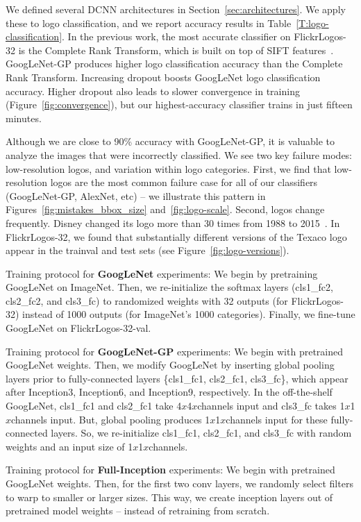 \documentclass{bmvc2k}
\begin{document}
We defined several DCNN architectures in Section~\ref{sec:architectures}.
We apply these to logo classification, and we report accuracy results in Table~\ref{T:logo-classification}.
In the previous work, the most accurate classifier on FlickrLogos-32 is the Complete Rank Transform, which is built on top of SIFT features~\cite{Boia2014}.
GoogLeNet-GP produces higher logo classification accuracy than the Complete Rank Transform.
Increasing dropout boosts GoogLeNet logo classification accuracy.
Higher dropout also leads to slower convergence in training (Figure~\ref{fig:convergence}), but our highest-accuracy classifier trains in just fifteen minutes.

Although we are close to 90\% accuracy with GoogLeNet-GP, it is valuable to analyze the images that were incorrectly classified.
We see two key failure modes: low-resolution logos, and variation within logo categories.
First, we find that low-resolution logos are the most common failure case for all of our classifiers (GoogLeNet-GP, AlexNet, etc) -- we illustrate this pattern in Figures~\ref{fig:mistakes_bbox_size} and~\ref{fig:logo-scale}.
Second, logos change frequently.
Disney changed its logo more than 30 times from 1988 to 2015~\cite{DisneyLogo}.
In FlickrLogos-32, we found that substantially different versions of the Texaco logo appear in the trainval and test sets (see Figure~\ref{fig:logo-versions}).


Training protocol for {\bf GoogLeNet} experiments:
We begin by pretraining GoogLeNet on ImageNet.
Then, we re-initialize the softmax layers (cls1\_fc2, cls2\_fc2, and cls3\_fc) to randomized weights with 32 outputs (for FlickrLogos-32) instead of 1000 outputs (for ImageNet's 1000 categories).
Finally, we fine-tune GoogLeNet on FlickrLogos-32-val.

Training protocol for {\bf GoogLeNet-GP} experiments:
We begin with pretrained GoogLeNet weights.
Then, we modify GoogLeNet by inserting global pooling layers prior to fully-connected layers \{cls1\_fc1, cls2\_fc1, cls3\_fc\}, which appear after Inception3, Inception6, and Inception9, respectively.
In the off-the-shelf GoogLeNet, cls1\_fc1 and cls2\_fc1 take 4$x$4$x$channels input and cls3\_fc takes 1$x$1$x$channels input.
But, global pooling produces 1$x$1$x$channels input for these fully-connected layers.
So, we re-initialize cls1\_fc1, cls2\_fc1, and cls3\_fc with random weights and an input size of 1$x$1$x$channels.

Training protocol for {\bf Full-Inception} experiments:
We begin with pretrained GoogLeNet weights.
Then, for the first two conv layers, we randomly select filters to warp to smaller or larger sizes.
This way, we create inception layers out of pretrained model weights -- instead of retraining from scratch.
\end{document}
